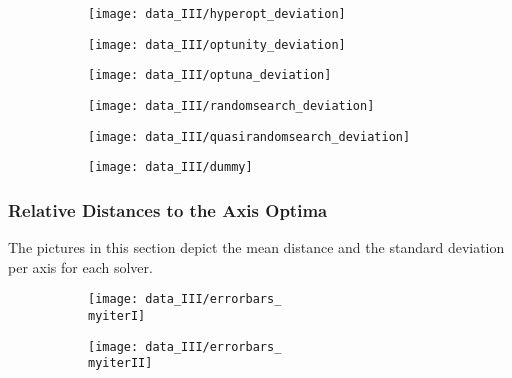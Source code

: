 \begin{figure}[h]
	\begin{subfigure}{0.5\textwidth}
		\texttt{[image: data\_III/hyperopt\_deviation]}
		\label{fig:hyperopt_deviation_III}
	\end{subfigure}
	\begin{subfigure}{0.5\textwidth}
		\texttt{[image: data\_III/optunity\_deviation]}
		\label{fig:optunity_deviation_III}
	\end{subfigure}
\end{figure}

\begin{figure}[h]
	\begin{subfigure}{0.5\textwidth}
		\texttt{[image: data\_III/optuna\_deviation]} 
		\label{fig:optuna_deviation_III}
	\end{subfigure}
	\begin{subfigure}{0.5\textwidth}
		\texttt{[image: data\_III/randomsearch\_deviation]}
		\label{fig:randomsearch_deviation_III}
	\end{subfigure}
\end{figure}

\begin{figure}[h]
	\begin{subfigure}{0.5\textwidth}
		\texttt{[image: data\_III/quasirandomsearch\_deviation]} 
		\label{fig:quasirandomsearch_deviation_III}
	\end{subfigure}
	\begin{subfigure}{0.5\textwidth}
		\texttt{[image: data\_III/dummy]}
		\label{fig:dummy2_III}
	\end{subfigure}
\end{figure}


\newpage


\subsubsection{Relative Distances to the Axis Optima}

The pictures in this section depict the mean distance and the standard deviation per axis for each solver.

\begin{figure}[h]
	\begin{subfigure}{0.5\textwidth}
		\texttt{[image: data\_III/errorbars\_\\myiterI]}
		\label{fig:errorbars_\myiterI_III}
	\end{subfigure}
	\begin{subfigure}{0.5\textwidth}
		\texttt{[image: data\_III/errorbars\_\\myiterII]}
		\label{fig:errorbars_\myiterII_III}
	\end{subfigure}
\end{figure}

